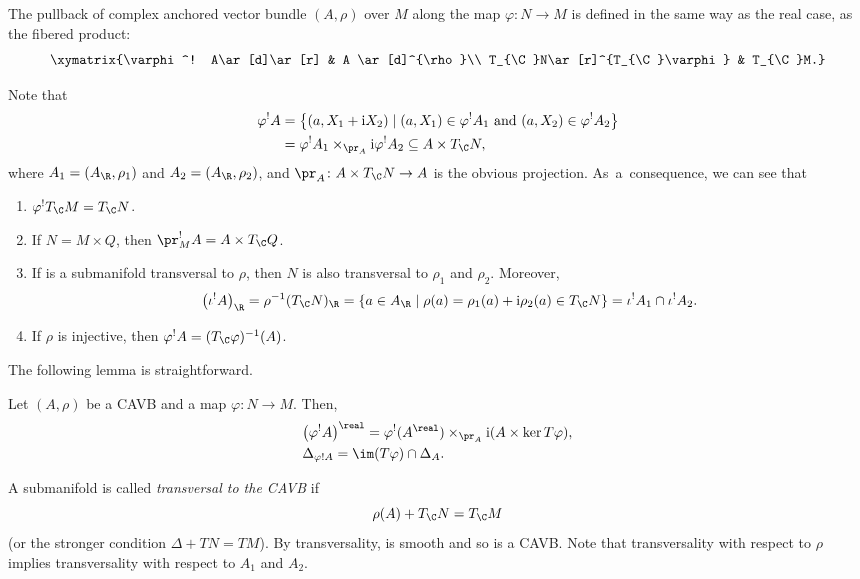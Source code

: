 The pullback of complex anchored vector bundle $(A, \rho) $ over $M$ along the map $\varphi\colon N\to M$ is defined in the same way as the real case, as the fibered product:
\[
\xymatrix{\varphi^! A\ar[d]\ar[r] & A \ar[d]^{\rho}\\
T_{\C}N\ar[r]^{T_{\C}\varphi} & T_{\C}M.}
\]

Note that
\begin{align*}
\varphi^! A&{}=\bigl\{(a, X_1+{\rm i}X_2) \mid  (a,X_1)\in \varphi^! A_1\ \text{and}\ (a,X_2)\in \varphi^! A_2\bigr\}\\
&{}=\varphi^! A_1 \times_{\pr_A} {\rm i}\varphi^! A_2\subseteq A\times T_{\C}N,
\end{align*}
where $A_1=(A_{\R}, \rho_1)$ and $A_2=(A_{\R}, \rho_2)$, and $\pr_A\colon A\times T_{\C}N\to A$ is the obvious projection.
As~a~consequence, we can see that
\begin{enumerate}\itemsep=0pt
\item $\varphi^!T_{\C}M=T_{\C}N$.
\item If $N=M\times Q$, then $\pr_M ^! A=A\times T_{\C}Q$.
\item If  is a submanifold transversal to $\rho$, then $N$ is also transversal to $\rho_1$ and $\rho_2$. Moreover,
\[
\bigl(\iota^! A\bigr)_{\R}=\rho^{-1}(T_{\C}N)_{\R}=\{a\in A_{\R}\mid \rho(a)=\rho_1(a)+{\rm i}\rho_2(a)\in T_{\C}N\}=\iota^{!}A_1\cap \iota^{!}A_2.
\]
\item If $\rho$ is injective, then $\varphi^! A=(T_{\C}\varphi)^{-1}(A)$.
\end{enumerate}

 The following lemma is straightforward.

\begin{Lemma}\label{repartbackward}
Let $(A,\rho)$ be a CAVB and a map $\varphi\colon N\to M$. Then,
\begin{align*} %
&\bigl(\varphi^! A\bigr)^{\real}=\varphi^! (A^{\real})\times_{\pr_A}{\rm i}(A\times \ker T\varphi),\\
&\Delta_{\varphi! A}=\im(T\varphi)\cap \Delta_{A}.
\end{align*}
\end{Lemma}

A submanifold  is called {\em transversal to the CAVB} if
\[\rho(A)+T_{\C}N=T_{\C}M\]
(or the stronger condition $\Delta+TN=TM$). By transversality,  is smooth and so is a CAVB. Note that transversality with respect to $\rho$ implies transversality with respect to $A_1$ and $A_2$.

